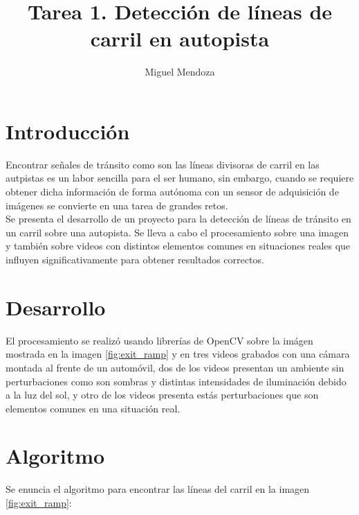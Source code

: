 \documentclass[10pt]{IEEEtran}
\title{Tarea 1. Detección de líneas de carril en autopista }
\author{Miguel Mendoza}
\begin{document}
\maketitle

\section{Introducci\'on}
Encontrar señales de tránsito como son las líneas divisoras de carril en las autpistas es un labor sencilla para el ser humano, sin embargo, cuando se requiere obtener dicha información de forma autónoma con un sensor de adquisición de imágenes se convierte en una tarea de grandes retos.\\
Se presenta el desarrollo de un proyecto para la detección de líneas de tránsito en un carril sobre una autopista. Se lleva a cabo el procesamiento sobre una imagen y también sobre videos con distintos elementos comunes en situaciones reales que influyen significativamente para obtener resultados correctos.


\section{Desarrollo}
El procesamiento se realizó usando librerías de OpenCV sobre la imágen mostrada en la imagen \ref{fig:exit_ramp} y en tres videos grabados con una cámara montada al frente de un automóvil, dos de los videos presentan un ambiente sin perturbaciones como son sombras y distintas intensidades de iluminación debido a la luz del sol, y otro de los videos presenta estás perturbaciones que son elementos comunes en una situación real. 

\section{Algoritmo}
Se enuncia el algoritmo para encontrar las líneas del carril en la imagen \ref{fig:exit_ramp}:\\
\end{document}
